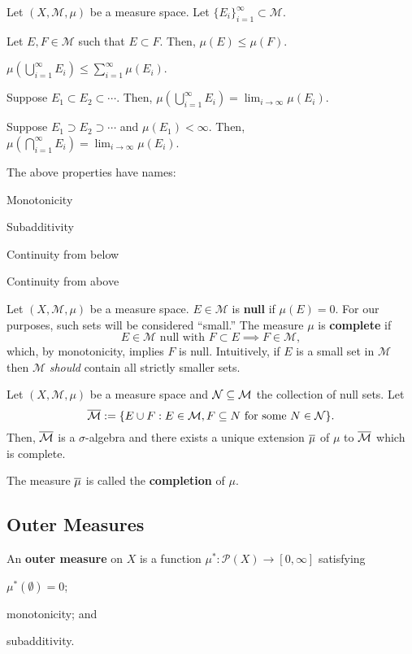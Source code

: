 \documentclass[11pt]{article}
\newcommand{\M}{\mathcal{M}}
\renewcommand{\P}{\mathcal{P}}
\newcommand{\llim}{\displaystyle\lim}
\newcommand{\ssum}{\displaystyle\sum}
\begin{document}
\begin{theorem}
Let $(X,\M,\mu)$ be a measure space. Let $\{E_i\}_{i=1}^{\infty}\subset\M$.
\begin{enum}{\alph}
\item Let $E,F\in\M$ such that $E\subset F$. Then, $\mu(E)\leq\mu(F)$.
\item $\mu(\bigcup_{i=1}^{\infty}E_i)\leq\ssum_{i=1}^{\infty}\mu(E_i)$.
\item Suppose $E_1\subset E_2\subset\cdots$. Then, $\mu(\bigcup_{i=1}^{\infty}E_i)=\llim_{i\to\infty}\mu(E_i)$.
\item Suppose $E_1\supset E_2\supset\cdots$ and $\mu(E_1)<\infty$. Then, $\mu(\bigcap_{i=1}^{\infty}E_i)=\llim_{i\to\infty}\mu(E_i)$.
\end{enum}
\end{theorem}

The above properties have names:
\begin{enum}{\alph}
\item Monotonicity
\item Subadditivity
\item Continuity from below
\item Continuity from above
\end{enum}

\begin{definition}
Let $(X,\M,\mu)$ be a measure space. $E\in\M$ is \textbf{null} if $\mu(E)=0$. For our purposes, such sets will be considered ``small.'' The measure $\mu$ is \textbf{complete} if 
$$E\in\M\textrm{ null with }F\subset E\implies F\in\M,$$
which, by monotonicity, implies $F$ is null. Intuitively, if $E$ is a small set in $\M$ then $\M$ \emph{should} contain all strictly smaller sets.
\end{definition}

\begin{theorem}
Let $(X,\M,\mu)$ be a measure space and $\mc{N}\subset\M$ the collection of null sets. Let 
$$\ov{\M}:=\{E\cup F : E\in\M,F\subset N\textrm{ for some }N\in\mc{N}\}.$$
Then, $\ov{\M}$ is a $\sigma$-algebra and there exists a unique extension $\overline{\mu}$ of $\mu$ to $\ov{\M}$ which is complete.
\end{theorem}

The measure $\overline{\mu}$ is called the \textbf{completion} of $\mu$.

\subsection{Outer Measures}
\begin{definition}
An \textbf{outer measure} on $X$ is a function $\mu^*: \P(X)\to[0,\infty]$ satisfying
\begin{enum}{\arabic}
\item $\mu^*(\emptyset)=0$;
\item monotonicity; and 
\item subadditivity.
\end{enum}
\end{definition}
\end{document}
